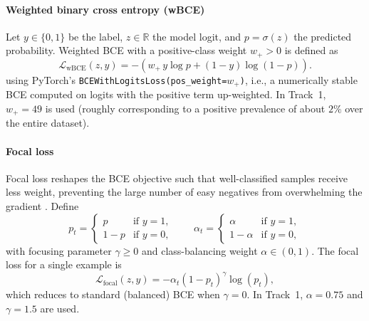 \paragraph*{Weighted binary cross entropy (wBCE)}
Let $y \in \{0,1\}$ be the label, $z \in \mathbb{R}$ the model logit, and $p=\sigma(z)$ the predicted probability.
Weighted BCE with a positive-class weight $w_{+}>0$ is defined as
\begin{equation}
  \mathcal{L}_{\text{wBCE}}(z,y)
  = - \left( w_{+}\, y \log p + (1-y)\log(1-p) \right).
  \label{eq:wbce}
\end{equation}
using PyTorch's \texttt{BCEWithLogitsLoss(pos\_weight=$w_{+}$)}, i.e., a numerically stable BCE computed on logits with the positive term up-weighted.
In Track~1, $w_{+}=49$ is used (roughly corresponding to a positive prevalence of about $2\%$ over the entire dataset).%

\paragraph*{Focal loss}
Focal loss reshapes the BCE objective such that well-classified samples receive less weight, preventing the large number of easy negatives from overwhelming the gradient \parencite{focal_2018}.
Define
\begin{equation}
  p_t =
  \begin{cases}
    p     & \text{if } y=1, \\
    1 - p & \text{if } y=0,
  \end{cases}
  \qquad
  \alpha_t =
  \begin{cases}
    \alpha     & \text{if } y=1, \\
    1 - \alpha & \text{if } y=0,
  \end{cases}
\end{equation}
with focusing parameter $\gamma \ge 0$ and class-balancing weight $\alpha \in (0,1)$.
The focal loss for a single example is
\begin{equation}
  \mathcal{L}_{\text{focal}}(z,y)
  = - \alpha_t (1-p_t)^{\gamma} \log(p_t),
  \label{eq:focal}
\end{equation}
which reduces to standard (balanced) BCE when $\gamma=0$.
In Track~1, $\alpha=0.75$ and $\gamma=1.5$ are used.

